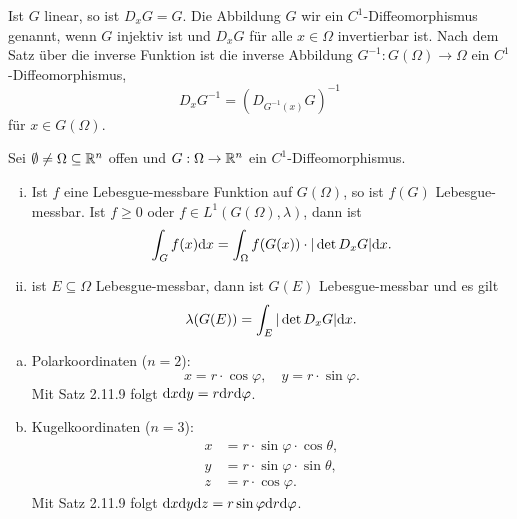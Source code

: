 \begin{rmrk*}
  Ist $G$ linear, so ist $D_x G = G$. Die Abbildung $G$ wir ein
  $C^1$-Diffeomorphismus genannt, wenn $G$ injektiv ist und $D_x G$ für alle $x
  \in \Omega$ invertierbar ist. Nach dem Satz über die inverse Funktion ist die
  inverse Abbildung $G^{-1} : G(\Omega) \to \Omega$ ein $C^1$-Diffeomorphismus,
  \[ D_x G^{-1} = (D_{G^{-1}(x)} G)^{-1} \]
  für $x \in G(\Omega)$.
\end{rmrk*}

\begin{thm}
  Sei $\emptyset \ne \Omega \subseteq \mathbb{R}^n$ offen und $G: \Omega \to \mathbb{R}^n$
  ein $C^1$-Diffeomorphismus.
  \begin{enumerate}[(i)]
    \item Ist $f$ eine Lebesgue-messbare Funktion auf $G(\Omega)$, so ist $f(G)$
      Lebesgue-messbar. Ist $f \ge 0$ oder $f \in L^1(G(\Omega),\lambda)$, dann
      ist
      \[ \int_G f(x) \mathrm{d} x = \int_\Omega f(G(x)) \cdot | \det D_xG |
        \mathrm{d} x. \]
    \item ist $E \subseteq \Omega$ Lebesgue-messbar, dann ist $G(E)$
      Lebesgue-messbar und es gilt
      \[ \lambda( G(E) ) = \int_E |\det D_x G| \mathrm{d} x. \]
  \end{enumerate}
\end{thm}

\begin{exmp}
  \begin{enumerate}[a)]
  \item Polarkoordinaten ($n=2$):
    \[ x = r \cdot \cos \varphi, \quad y = r \cdot \sin \varphi. \]
    Mit Satz 2.11.9 folgt $\mathrm{d} x \mathrm{d} y = r \mathrm{d} r \mathrm{d}
    \varphi$.
  \item Kugelkoordinaten ($n=3$):
    \begin{align*}
      x &= r \cdot \sin \varphi \cdot \cos \theta, \\
      y &= r \cdot \sin \varphi \cdot \sin \theta, \\
      z &= r \cdot \cos \varphi.
    \end{align*}
    Mit Satz 2.11.9 folgt $\mathrm{d} x \mathrm{d} y \mathrm{d} z = r \sin \varphi
    \mathrm{d} r \mathrm{d} \varphi$.
  \end{enumerate}
\end{exmp}

